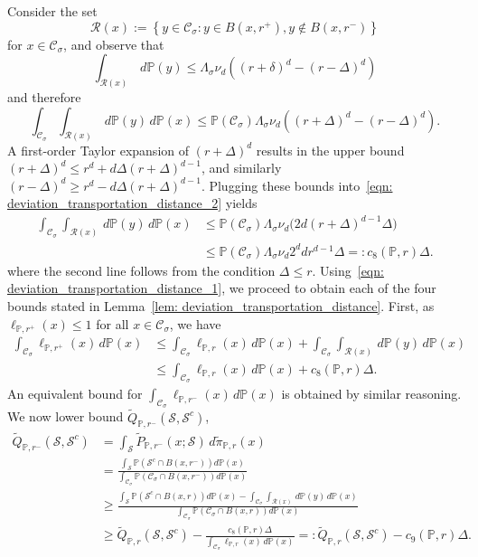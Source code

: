 \documentclass[11pt,twoside]{article}
\newcommand{\set}[1]{\left\{#1\right\}}
\newcommand{\1}{\mathbf{1}}
\newcommand{\Pbb}{\mathbb{P}}
\newcommand{\Sset}{\mathcal{S}}
\newcommand{\Cset}{\mathcal{C}}
\newcommand{\Csig}{\Cset_{\sigma}}
\begin{document}
Consider the set
\begin{equation*}
\mathcal{R}(x) := \set{y \in \Csig: y \in B(x,r^+), y \not\in B(x,r^-)}
\end{equation*} 
for $x \in \Csig$, and observe that
\begin{equation*}
\int_{\mathcal{R}(x)} \,d\Pbb(y) \leq \Lambda_{\sigma} \nu_d \left((r + \delta)^d - (r - \varDelta)^d\right)
\end{equation*}
and therefore
\begin{equation}
\label{eqn: deviation_transportation_distance_2}
\int_{\Csig} \int_{\mathcal{R}(x)} \,d\Pbb(y) \,d\Pbb(x) \leq \Pbb(\Csig )\Lambda_{\sigma} \nu_d \left((r + \varDelta)^d - (r - \varDelta)^d\right).
\end{equation}
A first-order Taylor expansion of $(r + \varDelta)^d$ results in the upper bound $(r + \varDelta)^d \leq r^d + d\varDelta(r + \varDelta)^{d - 1}$, and similarly $(r - \varDelta)^d \geq r^d - d\varDelta(r + \varDelta)^{d - 1}$. Plugging these bounds into~\eqref{eqn: deviation_transportation_distance_2} yields
\begin{align}
\int_{\Csig} \int_{\mathcal{R}(x)} \,d\Pbb(y) \,d\Pbb(x)  & \leq \Pbb(\Csig) \Lambda_{\sigma} \nu_d \bigl( 2d(r + \Delta)^{d - 1}\varDelta \bigr) \tag{1st-order Taylor expansion of $(r + \Delta)^d$ } \\
& \leq \Pbb(\Csig) \Lambda_{\sigma} \nu_d  2^{d}d r^{d-1}\varDelta =: c_8(\Pbb,r) \varDelta. \label{eqn: deviation_transportation_distance_1}
\end{align}
where the second line follows from the condition $\Delta \leq r$. Using~\eqref{eqn: deviation_transportation_distance_1}, we proceed to obtain each of the four bounds stated in Lemma~\ref{lem: deviation_transportation_distance}. First, as $\ell_{\Pbb,r^{+}}(x) \leq 1$ for all $x \in \Csig$, we have
\begin{align*}
\int_{\Csig} \ell_{\Pbb,r^+}(x) \,d\Pbb(x) & \leq \int_{\Csig} \ell_{\Pbb,r}(x) \,d\Pbb(x) + \int_{\Csig} \int_{\mathcal{R}(x)} \,d\Pbb(y) \,d\Pbb(x) \\
& \leq \int_{\Csig} \ell_{\Pbb,r}(x) \,d\Pbb(x) + c_8(\Pbb,r)\varDelta.
\end{align*}
An equivalent bound for $\int_{\Csig} \ell_{\Pbb,r^-}(x) \,d\Pbb(x)$ is obtained by similar reasoning. We now lower bound $\widetilde{Q}_{\Pbb,r^{-}}(\Sset, \Sset^c)$,
\begin{align*}
\widetilde{Q}_{\Pbb,r^{-}}(\Sset, \Sset^c) & = \int_{\Sset} \widetilde{P}_{\Pbb,r^-}(x; \Sset) \,d\widetilde{\pi}_{\Pbb,r}(x) \\
& = \frac{\int_{\Sset} \Pbb(\Sset^c \cap B(x,r^-)) d\Pbb(x)}{\int_{\Csig} \Pbb(\Csig \cap B(x,r^-)) d\Pbb(x)} \\
& \geq \frac{\int_{\Sset} \Pbb(\Sset^c \cap B(x,r)) d\Pbb(x) - \int_{\Csig} \int_{\mathcal{R}(x)} \,d\Pbb(y) \,d\Pbb(x)}{\int_{\Csig} \Pbb(\Csig \cap B(x,r)) d\Pbb(x)} \\
& \geq \widetilde{Q}_{\Pbb,r}(\Sset, \Sset^c) - \frac{c_8(\Pbb,r) \varDelta}{\int_{\Csig}\ell_{\Pbb,r}(x) \,d\Pbb(x)} =:\widetilde{Q}_{\Pbb,r}(\Sset, \Sset^c) - c_9(\Pbb,r) \varDelta.
\end{align*}
\end{document}

